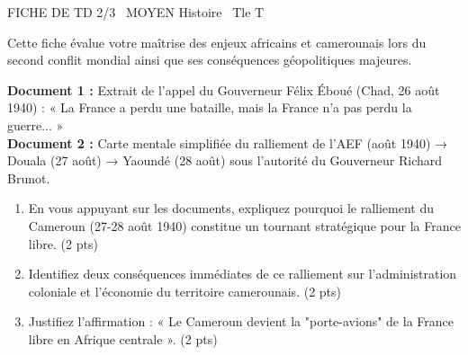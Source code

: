 \documentclass[11pt]{article}
\begin{document}
\begin{tcolorbox}[enhanced,colback=popink,colframe=popink,arc=10pt,boxrule=0pt,left=12pt,right=12pt,top=9pt,bottom=9pt]
{\color{white}\popxbold\small FICHE DE TD 2/3 \textbullet\ MOYEN \hfill Histoire \textbullet\ Tle T\par}
\end{tcolorbox}
\vspace{4pt}
Cette fiche évalue votre maîtrise des enjeux africains et camerounais lors du second conflit mondial ainsi que ses conséquences géopolitiques majeures.

\begin{exercice}
\textbf{Document 1 :} Extrait de l'appel du Gouverneur Félix Éboué (Chad, 26 août 1940) : « La France a perdu une bataille, mais la France n'a pas perdu la guerre... »\\
\textbf{Document 2 :} Carte mentale simplifiée du ralliement de l'AEF (août 1940) → Douala (27 août) → Yaoundé (28 août) sous l'autorité du Gouverneur Richard Brunot.
\begin{enumerate}
    \item En vous appuyant sur les documents, expliquez pourquoi le ralliement du Cameroun (27-28 août 1940) constitue un tournant stratégique pour la France libre. (2 pts)
    \item Identifiez deux conséquences immédiates de ce ralliement sur l'administration coloniale et l'économie du territoire camerounais. (2 pts)
    \item Justifiez l'affirmation : « Le Cameroun devient la "porte-avions" de la France libre en Afrique centrale ». (2 pts)
\end{enumerate}
\end{exercice}
\end{document}

